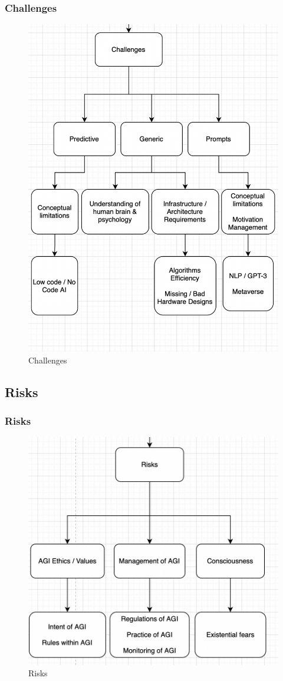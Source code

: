 \documentclass[
	11pt, %
]{beamer}
\begin{document}
\begin{frame}
	\frametitle{Challenges}
	
	\begin{figure}
		\includegraphics[width=0.8\linewidth]{Images/challenges.png}
		\caption{Challenges}
	\end{figure}
\end{frame}



\subsection{Risks}

\begin{frame}
	\frametitle{Risks}
	
	\begin{figure}
		\includegraphics[width=0.8\linewidth]{Images/risks.png}
		\caption{Risks}
	\end{figure}
\end{frame}
\end{document}
